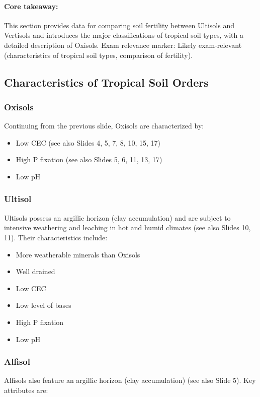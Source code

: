 \paragraph*{Core takeaway:} 
This section provides data for comparing soil fertility between Ultisols and Vertisols and introduces the major classifications of tropical soil types, with a detailed description of Oxisols. Exam relevance marker: Likely exam-relevant (characteristics of tropical soil types, comparison of fertility).

\subsection{Characteristics of Tropical Soil Orders} \subsubsection{Oxisols} Continuing from the previous slide, Oxisols are characterized by: 

\begin{itemize} 
    \item Low CEC (see also Slides 4, 5, 7, 8, 10, 15, 17)
    \item High P fixation (see also Slides 5, 6, 11, 13, 17)
    \item Low pH 
\end{itemize}

\subsubsection{Ultisol} Ultisols possess an argillic horizon (clay accumulation) and are subject to intensive weathering and leaching in hot and humid climates (see also Slides 10, 11). Their characteristics include: 

\begin{itemize} 
    \item More weatherable minerals than Oxisols 
    \item Well drained 
    \item Low CEC 
    \item Low level of bases 
    \item High P fixation 
    \item Low pH 
\end{itemize}

\subsubsection{Alfisol} 
Alfisols also feature an argillic horizon (clay accumulation) (see also Slide 5). Key attributes are: 

